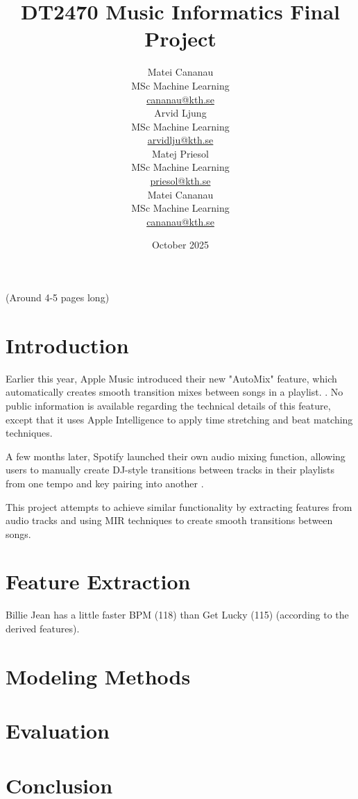 \documentclass{article}
\title{DT2470 Music Informatics Final Project}
\date{October 2025}
\author{
    \begin{minipage}[t]{0.24\textwidth}
        \centering
        Matei Cananau \\
        MSc Machine Learning \\
        \href{mailto:cananau@kth.se}{cananau@kth.se}
    \end{minipage}
    \hfill
    \begin{minipage}[t]{0.24\textwidth}
        \centering
        Arvid Ljung \\
        MSc Machine Learning \\
        \href{mailto:arvidlju@kth.se}{arvidlju@kth.se}
    \end{minipage}
    \hfill
    \begin{minipage}[t]{0.24\textwidth}
        \centering
        Matej Priesol \\
        MSc Machine Learning \\
        \href{mailto:priesol@kth.se}{priesol@kth.se}
    \end{minipage}
    \hfill
    \begin{minipage}[t]{0.24\textwidth}
        \centering
        Matei Cananau \\
        MSc Machine Learning \\
        \href{mailto:cananau@kth.se}{cananau@kth.se}
    \end{minipage}
}
\begin{document}
\maketitle

\tableofcontents

(Around 4-5 pages long)


\newpage

\section{Introduction}

Earlier this year, Apple Music introduced their new "AutoMix" feature, which automatically creates smooth transition mixes between songs in a playlist. \cite{apple2025}. No public information is available regarding the technical details of this feature, except that it uses Apple Intelligence to apply time stretching and beat matching techniques.

A few months later, Spotify launched their own audio mixing function, allowing users to manually create DJ-style transitions between tracks in their playlists from one tempo and key pairing into another \cite{spotify2025}.

This project attempts to achieve similar functionality by extracting features from audio tracks and using MIR techniques to create smooth transitions between songs.

\section{Feature Extraction}

Billie Jean has a little faster BPM (118) than Get Lucky (115) (according to the derived features).

\section{Modeling Methods}
\cite{vandeveire2018automateddj}

\section{Evaluation}

\section{Conclusion}



\end{document}
